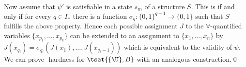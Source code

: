         Now assume that $\psi'$ is satisfiable in a state $s_m$ of a structure $S$. This is if and only if for every $q\in I_{\exists}$ there is a function $\sigma_{q}:\{0,1\}^{q-1}\rightarrow\{0,1\}$ such that $S$ fulfills the above property. Hence each possible assignment $J$ to the $\forall$-quantified variables $\{x_{p_1},\dots,x_{p_k}\}$ can be extended to an assignment to $\{x_1,\dots,x_n\}$ by $J(x_{q_i})=\sigma_{q_i}(J(x_1),\dots,J(x_{q_i-1}))$ which is equivalent to the validity of $\psi$.
        We can prove \PSPACE-hardness for $\tsat{\{\U\},B}$ with an analogous construction.\qed
